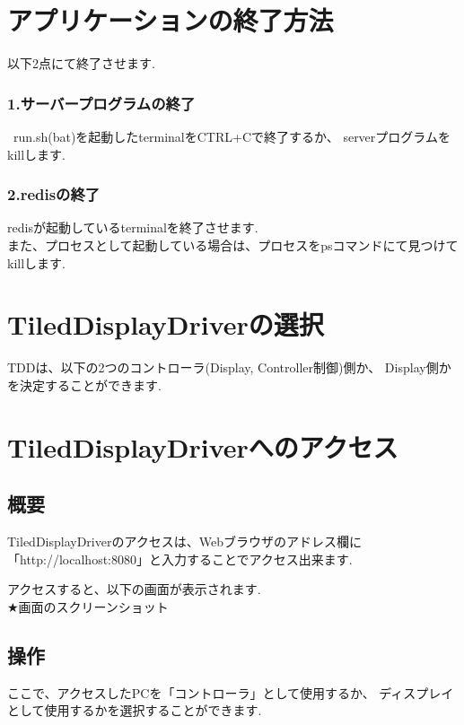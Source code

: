 \documentclass[a4paper,10pt,oneside]{jsbook}
\begin{document}
\chapter{アプリケーションの終了方法}

以下2点にて終了させます.\\

\subsection{1.サーバープログラムの終了}\
run.sh(bat)を起動したterminalをCTRL+Cで終了するか、
serverプログラムをkillします.\\


\subsection{2.redisの終了}
redisが起動しているterminalを終了させます.\\
また、プロセスとして起動している場合は、プロセスをpsコマンドにて見つけて
killします.\\

\chapter{TiledDisplayDriverの選択}
TDDは、以下の2つのコントローラ(Display, Controller制御)側か、
Display側かを決定することができます.\\

\chapter{TiledDisplayDriverへのアクセス}
\section{概要}
TiledDisplayDriverのアクセスは、Webブラウザのアドレス欄に
「http://localhost:8080」と入力することでアクセス出来ます.

アクセスすると、以下の画面が表示されます.\\
★画面のスクリーンショット\\


\section{操作}
ここで、アクセスしたPCを「コントローラ」として使用するか、
ディスプレイとして使用するかを選択することができます.\\
\end{document}
